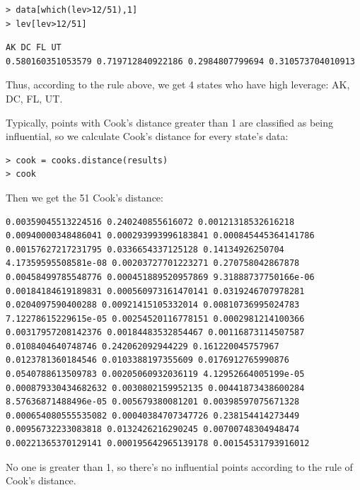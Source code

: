 \documentclass[letterpaper,11pt]{article}
\begin{document}
\begin{lstlisting}
> data[which(lev>12/51),1]
> lev[lev>12/51]
\end{lstlisting}

\begin{lstlisting}
AK DC FL UT
0.580160351053579 0.719712840922186 0.2984807799694 0.310573704010913
\end{lstlisting}

Thus, according to the rule above, we get 4 states who have high leverage: AK, DC, FL, UT.

Typically, points with Cook's distance greater than 1 are classified as being influential, so we calculate Cook's distance for every state's data:
\begin{lstlisting}
> cook = cooks.distance(results)
> cook
\end{lstlisting}
Then we get the 51 Cook's distance:
\begin{lstlisting}
0.00359045513224516 0.240240855616072 0.00121318532616218 0.00940000348486041 0.000293993996183841 0.000845445364141786 0.00157627217231795 0.0336654337125128 0.14134926250704 4.17359595508581e-08 0.00203727701223271 0.270758042867878 0.00458499785548776 0.000451889520957869 9.31888737750166e-06 0.00184184619189831 0.000560973161470141 0.0319246707978281 0.0204097590400288 0.00921415105332014 0.00810736995024783 7.12278615229615e-05 0.00254520116778151 0.0002981214100366 0.00317957208142376 0.00184483532854467 0.00116873114507587 0.0108404640748746 0.242062092944229 0.161220045757967 0.0123781360184546 0.0103388197355609 0.0176912765990876 0.0540788613509783 0.00205060932036119 4.12952664005199e-05 0.000879330434682632 0.0030802159952135 0.00441873438600284 8.57636871488496e-05 0.005679380081201 0.00398597075671328 0.000654080555535082 0.00040384707347726 0.238154414273449 0.00956732233083818 0.0132426216290245 0.00700748304948474 0.00221365370129141 0.000195642965139178 0.00154531793916012
\end{lstlisting}
No one is greater than 1, so there's no influential points according to the rule of Cook's distance.

\end{document}
